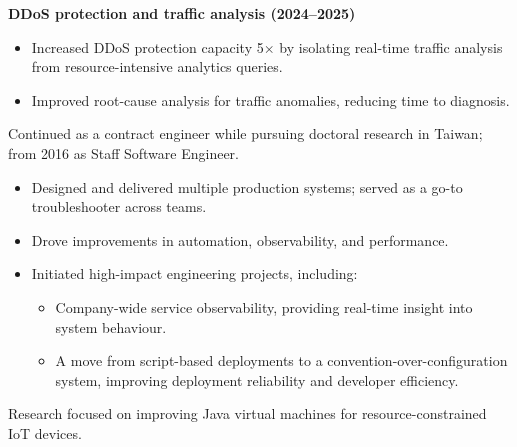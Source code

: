 \documentclass[10pt,a4paper]{../altacv}
\begin{document}
	\textbf{DDoS protection and traffic analysis (2024--2025)}
	\begin{itemize}
		\item Increased DDoS protection capacity 5$\times$ by isolating real-time traffic analysis from resource-intensive analytics queries.
		\item Improved root-cause analysis for traffic anomalies, reducing time to diagnosis.
	\end{itemize}
	
	\medskip

	
	\bigskip
	
	
	Continued as a contract engineer while pursuing doctoral research in Taiwan; from 2016 as Staff Software Engineer.
	
	\begin{itemize}
		\item Designed and delivered multiple production systems; served as a go-to troubleshooter across teams.
		\item Drove improvements in automation, observability, and performance.
		\item Initiated high-impact engineering projects, including:
		\begin{itemize}
			\item Company-wide service observability, providing real-time insight into system behaviour.
			\item A move from script-based deployments to a convention-over-configuration system, improving deployment reliability and developer efficiency.
		\end{itemize}
	\end{itemize}
	
	\medskip
	
	\bigskip
	
	
	\medskip
	
	
	Research focused on improving Java virtual machines for resource-constrained IoT devices.
	
\end{document}
